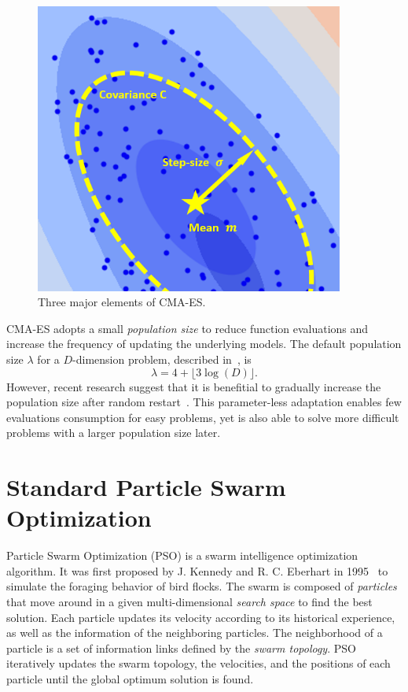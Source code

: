 \begin{figure}
\centering
\includegraphics[width=4in]{CMA_elements}
\caption{Three major elements of CMA-ES.}\label{fig:CMA_elements}
\end{figure}

CMA-ES adopts a small \textit{population size} to reduce function evaluations and increase the frequency of updating the underlying models.
The default population size $\lambda$ for a $D$-dimension problem, described in~\cite{Hansen:2006:CMA_ES_review}, is
\begin{displaymath}
\lambda = 4 + \lfloor 3 \log(D) \rfloor .
\end{displaymath}
However, recent research suggest that it is benefitial to gradually increase the population size after random restart~\cite{Auger:2005:IPOP_CMAES}.
This parameter-less adaptation enables few evaluations consumption for easy problems, 
yet is also able to solve more difficult problems with a larger population size later.





\section{Standard Particle Swarm Optimization}

Particle Swarm Optimization (PSO) is a swarm intelligence optimization algorithm. 
It was first proposed by J. Kennedy and R. C. Eberhart in 1995~\cite{Kennedy:1995:PSO} to simulate the foraging behavior of bird flocks.
The swarm is composed of \textit{particles} that move around in a given multi-dimensional \textit{search space} to find the best solution.
Each particle updates its velocity according to its historical experience, as well as the information of the neighboring particles.
The neighborhood of a particle is a set of information links defined by the \textit{swarm topology}. %
PSO iteratively updates the swarm topology, the velocities, and the positions of each particle until the global optimum solution is found.


